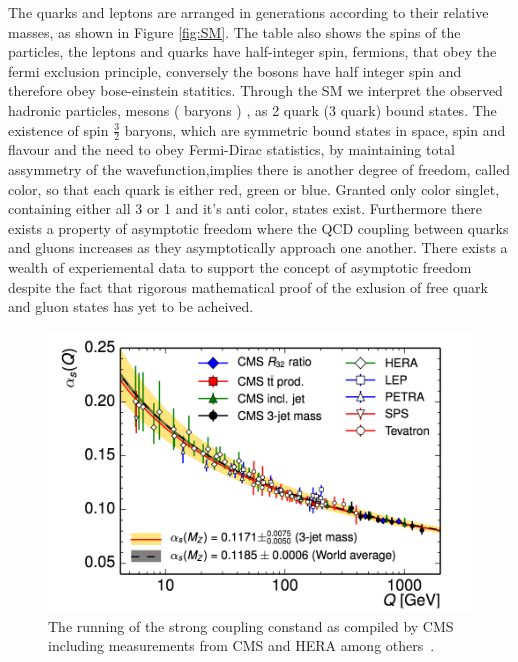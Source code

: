 The quarks and leptons are arranged in generations according to their relative masses, as shown in Figure \ref{fig:SM}. The table also shows the spins of the particles, the leptons and quarks have half-integer spin, fermions, that obey the fermi exclusion principle, conversely the bosons have half integer spin and therefore obey bose-einstein statitics. Through the SM we interpret the observed hadronic particles, mesons ( baryons ) , as 2 quark (3 quark) bound states. The existence of spin $\frac{3}{2}$ baryons, which are symmetric bound states in space, spin and flavour and the need to obey Fermi-Dirac statistics, by maintaining total assymmetry of the wavefunction,implies there is another degree of freedom, called color, so that each quark is either red, green or blue. Granted only color singlet, containing either all 3 or 1 and it's anti color, states exist. Furthermore there exists a property of asymptotic freedom where the QCD coupling between quarks and gluons increases as they asymptotically approach one another. There exists a wealth of experiemental data to support the concept of asymptotic freedom despite the fact that rigorous mathematical proof of the exlusion of free quark and gluon states has yet to be acheived.




\begin{figure}[htb]
\centering
\includegraphics[width=1.0\textwidth]{visuals/strong-coupling-cms.png}
\caption{The running of the strong coupling constand as compiled by CMS including measurements from CMS and HERA among others~\cite{CMS:2014mna}.}
\label{fig:alphas}
\end{figure}







